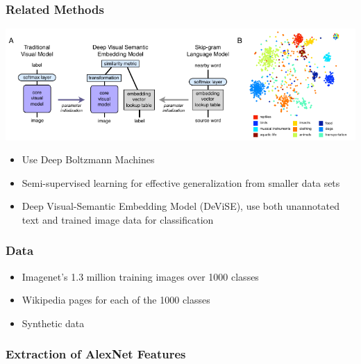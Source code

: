 \documentclass{beamer}
\begin{document}
\begin{frame}
  \frametitle{Related Methods}
  \begin{center}
    \includegraphics[width=\textwidth]{assets/devise.pdf}
  \end{center}
  \begin{itemize}
  \item Use Deep Boltzmann Machines \citep{Srivastava14}
  \item Semi-supervised learning for effective generalization from smaller data sets \citep{Kingma14b}
  \item Deep Visual-Semantic Embedding Model (DeViSE), use both unannotated text and trained image data for classification \citep{Frome13}
  \end{itemize}
\end{frame}

\begin{frame}
  \frametitle{Data}
  \begin{itemize}
  \item Imagenet's 1.3 million training images over 1000 classes
  \item Wikipedia pages for each of the 1000 classes
  \item Synthetic data
  \end{itemize}
\end{frame}

\begin{frame}
  \frametitle{Extraction of AlexNet Features}
\end{frame}
\end{document}
